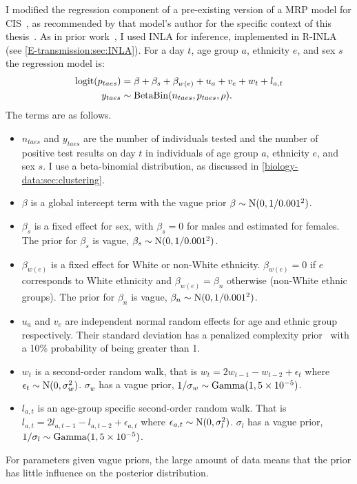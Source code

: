 \documentclass[thesis.tex]{subfiles}
\begin{document}
I modified the regression component of a pre-existing version of a MRP model for CIS~\autocite{pouwelsMRPvaccination}, as recommended by that model's author for the specific context of this thesis~.
As in prior work~\autocite{pouwelsMRPvaccination}, I used INLA for inference, implemented in R-INLA (see \cref{E-transmission:sec:INLA}).
For a day $t$, age group $a$, ethnicity $e$, and sex $s$ the regression model is:
\begin{align}
    \operatorname{logit}(p_{taes}) &= \beta + \beta_s + \beta_{w(e)} + u_a + v_e + w_t + l_{a,t} \\
    y_{taes} &\sim \operatorname{BetaBin}(n_{taes}, p_{taes}, \rho).
\end{align}
The terms are as follows.
\begin{itemize}
    \item $n_{taes}$ and $y_{taes}$ are the number of individuals tested and the number of positive test results on day $t$ in individuals of age group $a$, ethnicity $e$, and sex $s$. I use a beta-binomial distribution, as discussed in \cref{biology-data:sec:clustering}.
    \item $\beta$ is a global intercept term with the vague prior $\beta \sim \operatorname{N}(0, 1/0.001^2)$.
    \item $\beta_s$ is a fixed effect for sex, with $\beta_s = 0$ for males and estimated for females. The prior for $\beta_s$ is vague, $\beta_s \sim \operatorname{N}(0, 1/0.001^2)$.
    \item $\beta_{w(e)}$ is a fixed effect for White or non-White ethnicity. $\beta_{w(e)} = 0$ if $e$ corresponds to White ethnicity and $\beta_{w(e)} = \beta_{n}$ otherwise (\ie non-White ethnic groups).
      The prior for $\beta_n$ is vague, $\beta_n \sim \operatorname{N}(0, 1/0.001^2)$.
    \item $u_a$ and $v_e$ are independent normal random effects for age and ethnic group respectively. Their standard deviation has a penalized complexity prior~\autocite{simpsonPenalising} with a 10\% probability of being greater than 1.
    \item $w_t$ is a second-order random walk, that is $w_t = 2w_{t-1} - w_{t-2} + \epsilon_t$ where $\epsilon_t \sim \operatorname{N}(0, \sigma_w^2)$.
      $\sigma_w$ has a vague prior, $1/\sigma_w \sim \operatorname{Gamma}(1, 5 \times 10^{-5})$.
    \item $l_{a,t}$ is an age-group specific second-order random walk.
      That is $l_{a,t} = 2l_{a,t-1} - l_{a,t-2} + \epsilon_{a,t}$ where $\epsilon_{a,t} \sim \operatorname{N}(0, \sigma_l^2)$.
      $\sigma_l$ has a vague prior, $1/\sigma_l \sim \operatorname{Gamma}(1, 5 \times 10^{-5})$.
\end{itemize}
For parameters given vague priors, the large amount of data means that the prior has little influence on the posterior distribution.
\end{document}
